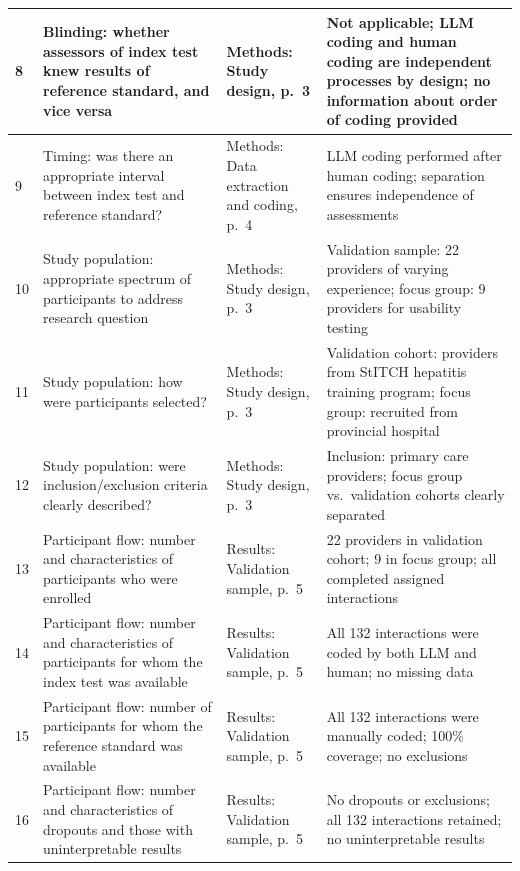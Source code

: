 \documentclass{article}
\begin{document}
\begin{table}[htbp]
\begin{tabularx}{\textwidth}{|p{0.8cm}|p{5.5cm}|p{6.5cm}|p{3cm}|}
8 & Blinding: whether assessors of index test knew results of reference standard, and vice versa & Methods: Study design, p.\ 3 & Not applicable; LLM coding and human coding are independent processes by design; no information about order of coding provided \\
\hline

9 & Timing: was there an appropriate interval between index test and reference standard? & Methods: Data extraction and coding, p.\ 4 & LLM coding performed after human coding; separation ensures independence of assessments \\
\hline

10 & Study population: appropriate spectrum of participants to address research question & Methods: Study design, p.\ 3 & Validation sample: 22 providers of varying experience; focus group: 9 providers for usability testing \\
\hline

11 & Study population: how were participants selected? & Methods: Study design, p.\ 3 & Validation cohort: providers from StITCH hepatitis training program; focus group: recruited from provincial hospital \\
\hline

12 & Study population: were inclusion/exclusion criteria clearly described? & Methods: Study design, p.\ 3 & Inclusion: primary care providers; focus group vs.\ validation cohorts clearly separated \\
\hline

13 & Participant flow: number and characteristics of participants who were enrolled & Results: Validation sample, p.\ 5 & 22 providers in validation cohort; 9 in focus group; all completed assigned interactions \\
\hline

14 & Participant flow: number and characteristics of participants for whom the index test was available & Results: Validation sample, p.\ 5 & All 132 interactions were coded by both LLM and human; no missing data \\
\hline

15 & Participant flow: number of participants for whom the reference standard was available & Results: Validation sample, p.\ 5 & All 132 interactions were manually coded; 100\% coverage; no exclusions \\
\hline

16 & Participant flow: number and characteristics of dropouts and those with uninterpretable results & Results: Validation sample, p.\ 5 & No dropouts or exclusions; all 132 interactions retained; no uninterpretable results \\
\hline


\end{tabularx}
\end{table}
\end{document}
